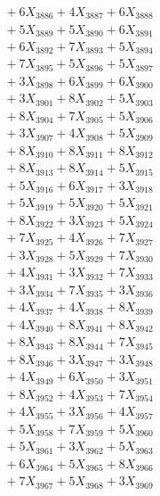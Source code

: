 \documentclass[a4paper,10pt]{article}
\begin{document}
{\begin{align}
&\;  + 6 X_{3886} + 4 X_{3887} + 6 X_{3888} \\[0.3ex]
&\;  + 5 X_{3889} + 5 X_{3890} + 6 X_{3891} \\[0.3ex]
&\;  + 6 X_{3892} + 7 X_{3893} + 5 X_{3894} \\[0.3ex]
&\;  + 7 X_{3895} + 5 X_{3896} + 5 X_{3897} \\[0.3ex]
&\;  + 3 X_{3898} + 6 X_{3899} + 6 X_{3900} \\[0.3ex]
&\;  + 3 X_{3901} + 8 X_{3902} + 5 X_{3903} \\[0.3ex]
&\;  + 8 X_{3904} + 7 X_{3905} + 5 X_{3906} \\[0.3ex]
&\;  + 3 X_{3907} + 4 X_{3908} + 5 X_{3909} \\[0.5ex]\allowbreak
&\;  + 8 X_{3910} + 8 X_{3911} + 8 X_{3912} \\[0.3ex]
&\;  + 8 X_{3913} + 8 X_{3914} + 5 X_{3915} \\[0.3ex]
&\;  + 5 X_{3916} + 6 X_{3917} + 3 X_{3918} \\[0.3ex]
&\;  + 5 X_{3919} + 5 X_{3920} + 5 X_{3921} \\[0.3ex]
&\;  + 8 X_{3922} + 3 X_{3923} + 5 X_{3924} \\[0.3ex]
&\;  + 7 X_{3925} + 4 X_{3926} + 7 X_{3927} \\[0.3ex]
&\;  + 3 X_{3928} + 5 X_{3929} + 7 X_{3930} \\[0.3ex]
&\;  + 4 X_{3931} + 3 X_{3932} + 7 X_{3933} \\[0.3ex]
&\;  + 3 X_{3934} + 7 X_{3935} + 3 X_{3936} \\[0.3ex]
&\;  + 4 X_{3937} + 4 X_{3938} + 8 X_{3939} \\[0.5ex]\allowbreak
&\;  + 4 X_{3940} + 8 X_{3941} + 8 X_{3942} \\[0.3ex]
&\;  + 8 X_{3943} + 8 X_{3944} + 7 X_{3945} \\[0.3ex]
&\;  + 8 X_{3946} + 3 X_{3947} + 3 X_{3948} \\[0.3ex]
&\;  + 4 X_{3949} + 6 X_{3950} + 3 X_{3951} \\[0.3ex]
&\;  + 8 X_{3952} + 4 X_{3953} + 7 X_{3954} \\[0.3ex]
&\;  + 4 X_{3955} + 3 X_{3956} + 4 X_{3957} \\[0.3ex]
&\;  + 5 X_{3958} + 7 X_{3959} + 5 X_{3960} \\[0.3ex]
&\;  + 5 X_{3961} + 3 X_{3962} + 5 X_{3963} \\[0.3ex]
&\;  + 6 X_{3964} + 5 X_{3965} + 8 X_{3966} \\[0.3ex]
&\;  + 7 X_{3967} + 5 X_{3968} + 3 X_{3969} \\[0.5ex]\allowbreak

\end{align}}
\end{document}
